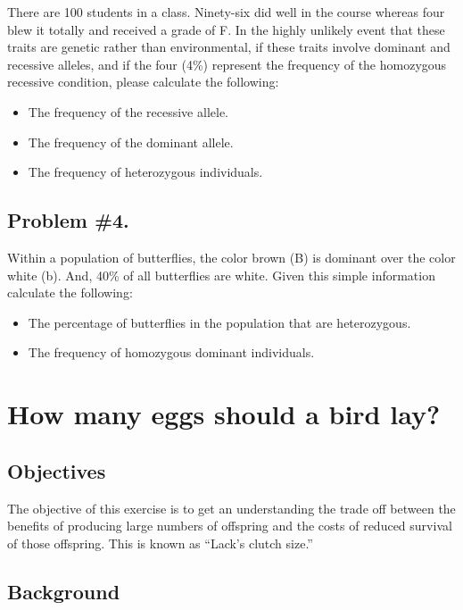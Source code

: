 \documentclass[
  a4paper]{book}
\providecommand{\tightlist}{%
  \setlength{\itemsep}{0pt}\setlength{\parskip}{0pt}}
\begin{document}
There are 100 students in a class. Ninety-six did well in the course
whereas four blew it totally and received a grade of F. In the highly
unlikely event that these traits are genetic rather than environmental,
if these traits involve dominant and recessive alleles, and if the four
(4\%) represent the frequency of the homozygous recessive condition,
please calculate the following:

\begin{itemize}
\tightlist
\item
  The frequency of the recessive allele.
\item
  The frequency of the dominant allele.
\item
  The frequency of heterozygous individuals.
\end{itemize}

\hypertarget{problem-4.}{%
\section{Problem \#4.}\label{problem-4.}}

Within a population of butterflies, the color brown (B) is dominant over
the color white (b). And, 40\% of all butterflies are white. Given this
simple information calculate the following:

\begin{itemize}
\tightlist
\item
  The percentage of butterflies in the population that are heterozygous.
\item
  The frequency of homozygous dominant individuals.
\end{itemize}

\hypertarget{how-many-eggs-should-a-bird-lay}{%
\chapter{How many eggs should a bird
lay?}\label{how-many-eggs-should-a-bird-lay}}

\hypertarget{objectives}{%
\section{Objectives}\label{objectives}}

The objective of this exercise is to get an understanding the trade off
between the benefits of producing large numbers of offspring and the
costs of reduced survival of those offspring. This is known as ``Lack's
clutch size.''

\hypertarget{background-1}{%
\section{Background}\label{background-1}}
\end{document}
